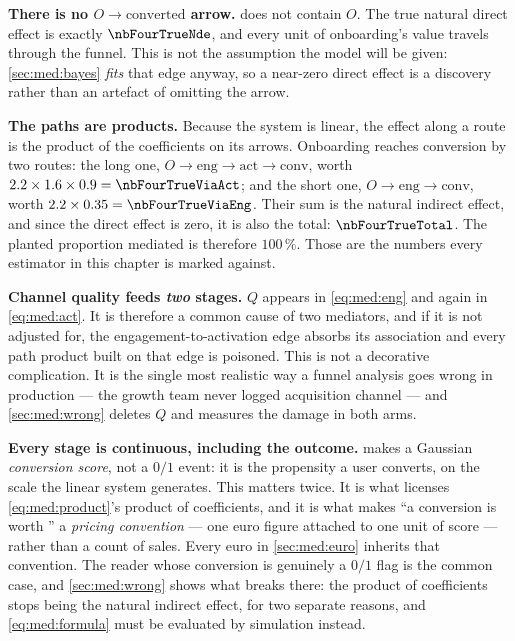 \textbf{There is no $O \to \text{converted}$ arrow.}  does not contain $O$. The
true natural direct effect is exactly $\nbFourTrueNde$, and every unit of onboarding's value
travels through the funnel. This is not the assumption the model will be given: \cref{sec:med:bayes}
\emph{fits} that edge anyway, so a near-zero direct effect is a discovery rather than an artefact of
omitting the arrow.

\textbf{The paths are products.} Because the system is linear, the effect along a route is the
product of the coefficients on its arrows. Onboarding reaches conversion by two routes: the long
one, $O \to \text{eng} \to \text{act} \to \text{conv}$, worth
$2.2 \times 1.6 \times 0.9 = \nbFourTrueViaAct$; and the short one, $O \to \text{eng} \to
\text{conv}$, worth $2.2 \times 0.35 = \nbFourTrueViaEng$. Their sum is the natural indirect
effect, and since the direct effect is zero, it is also the total: $\nbFourTrueTotal$. The planted
proportion mediated is therefore $100\,\%$. Those are the numbers every estimator in this chapter
is marked against.

\textbf{Channel quality feeds \emph{two} stages.} $Q$ appears in \cref{eq:med:eng} and again in
\cref{eq:med:act}. It is therefore a common cause of two mediators, and if it is not adjusted for,
the engagement-to-activation edge absorbs its association and every path product built on that
edge is poisoned. This is not a decorative complication. It is the single most realistic way a
funnel analysis goes wrong in production --- the growth team never logged acquisition channel ---
and \cref{sec:med:wrong} deletes $Q$ and measures the damage in both arms.

\textbf{Every stage is continuous, including the outcome.}  makes
 a Gaussian \emph{conversion score}, not a $0/1$ event: it is the propensity a user
converts, on the scale the linear system generates. This matters twice. It is what licenses
\cref{eq:med:product}'s product of coefficients, and it is what makes ``a conversion is worth
\eur{\nbFourValuePerConv}'' a \emph{pricing convention} --- one euro figure attached to one unit of
score --- rather than a count of sales. Every euro in \cref{sec:med:euro} inherits that convention.
The reader whose conversion is genuinely a $0/1$ flag is the common case, and
\cref{sec:med:wrong} shows what breaks there: the product of coefficients stops being the natural
indirect effect, for two separate reasons, and \cref{eq:med:formula} must be evaluated by simulation
instead.

